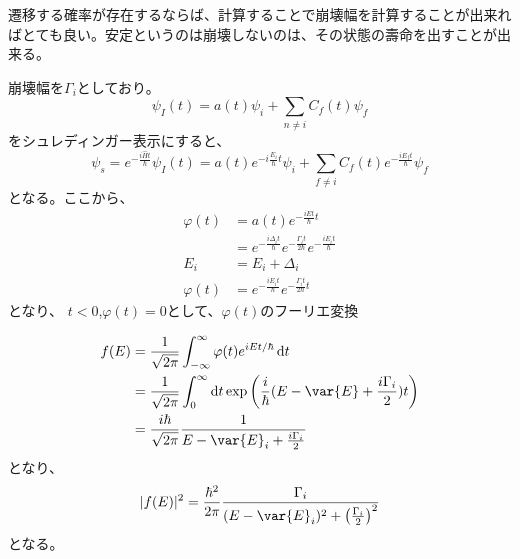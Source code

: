 \documentclass[titlepage]{ltjsarticle}
\begin{document}
遷移する確率が存在するならば、計算することで崩壊幅を計算することが出来ればとても良い。安定というのは崩壊しないのは、その状態の壽命を出すことが出来る。

崩壊幅を\(\Gamma_i\)としており。
\begin{equation}
  \psi_I (t) = a(t) \psi_i + \sum_{n\ne i} C_f(t) \psi_f
\end{equation}
をシュレディンガー表示にすると、
\begin{equation}
  \psi_s = e^{-\frac{i \hat{H}t}{\hbar}}\psi_I(t) = a(t) e^{- i \frac{E_i }{\hbar} t}\psi_i + \sum_{f \ne i} C_f(t)e^{-\frac{iE_f t}{\hbar}}\psi_f  
\end{equation}
となる。ここから、
\begin{align}
  \varphi(t) & = a(t) e^{-\frac{iE t}{\hbar}t} \\
  & = e^{-\frac{i \varDelta_i t }{\hbar}} e^{-\frac{\Gamma_i t}{2 \hbar}}e^{-\frac{iE_i t}{\hbar}}\\
  E_i & = E_i + \varDelta_i \\
  \varphi(t) & = e^{-\frac{iE_i t}{\hbar}} e^{-\frac{\Gamma_i t}{2 \hbar}t}
\end{align}
となり、
\(t<0\),\(\varphi(t)=0\)として、\(\varphi(t)\)のフーリエ変換

\begin{align}
  f(E) & = \frac{1}{\sqrt{2\pi}}\int_{-\infty }^{\infty} \varphi(t) e^{iEt/\hbar} \odif{t}\\
  & = \frac{1}{\sqrt{2\pi}}\int^{\infty}_{0}\odif{t} \exp\left( \frac{i }{\hbar}(E-\var{E}+\frac{i \Gamma_{i}}{2})t \right)\\
  & = \frac{i \hbar}{\sqrt{2\pi}}\frac{1}{E-\var{E}_i +\frac{i \Gamma_i}{2}}
\end{align}
となり、
\begin{equation}
  |f(E)|^2 = \frac{\hbar^2}{2\pi} \frac{\Gamma_i}{(E-\var{E}_i)^2 + \left( \frac{\Gamma_i}{2} \right)^2}
\end{equation}
となる。
\end{document}
